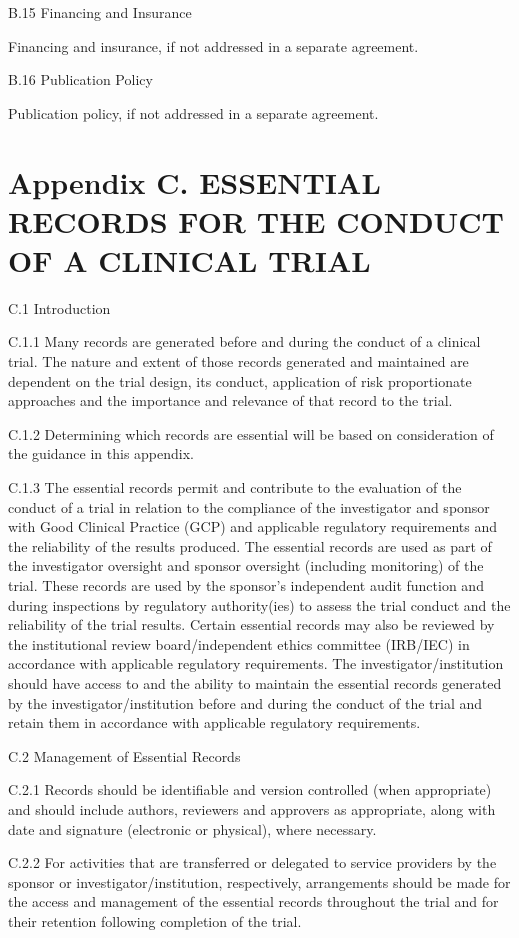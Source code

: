 \documentclass[11pt]{article}
\begin{document}
B.15 Financing and Insurance


Financing and insurance, if not addressed in a separate agreement.


B.16 Publication Policy


Publication policy, if not addressed in a separate agreement.


\section{Appendix C. ESSENTIAL RECORDS FOR THE CONDUCT OF A CLINICAL TRIAL}

C.1 Introduction


C.1.1 Many records are generated before and during the conduct of a clinical trial. The nature and extent of those records generated and maintained are dependent on the trial design, its conduct, application of risk proportionate approaches and the importance and relevance of that record to the trial.


C.1.2 Determining which records are essential will be based on consideration of the guidance in this appendix.


C.1.3 The essential records permit and contribute to the evaluation of the conduct of a trial in relation to the compliance of the investigator and sponsor with Good Clinical Practice (GCP) and applicable regulatory requirements and the reliability of the results produced. The essential records are used as part of the investigator oversight and sponsor oversight (including monitoring) of the trial. These records are used by the sponsor's independent audit function and during inspections by regulatory authority(ies) to assess the trial conduct and the reliability of the trial results. Certain essential records may also be reviewed by the institutional review board/independent ethics committee (IRB/IEC) in accordance with applicable regulatory requirements. The investigator/institution should have access to and the ability to maintain the essential records generated by the investigator/institution before and during the conduct of the trial and retain them in accordance with applicable regulatory requirements.


C.2 Management of Essential Records


C.2.1 Records should be identifiable and version controlled (when appropriate) and should include authors, reviewers and approvers as appropriate, along with date and signature (electronic or physical), where necessary.


C.2.2 For activities that are transferred or delegated to service providers by the sponsor or investigator/institution, respectively, arrangements should be made for the access and management of the essential records throughout the trial and for their retention following completion of the trial.
\end{document}

